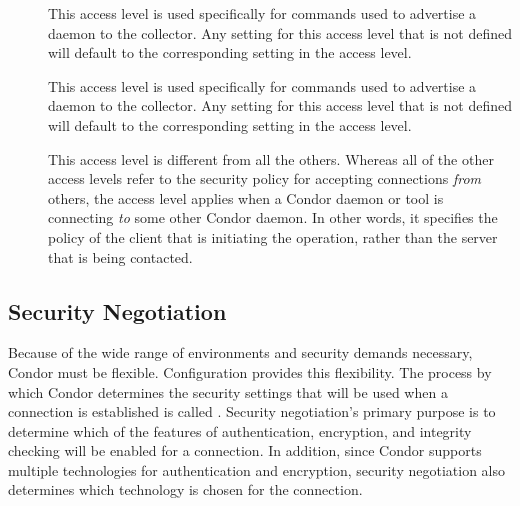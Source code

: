 \begin{description}
\item[] \label{sec-level-advertise-master} This
   access level is used specifically for commands used to advertise a
    daemon to the collector.  Any setting for this access
   level that is not defined will default to the corresponding setting
   in the  access level.

\item[] \label{sec-level-advertise-master} This
   access level is used specifically for commands used to advertise a
    daemon to the collector.  Any setting for this access
   level that is not defined will default to the corresponding setting
   in the  access level.

\item[] \label{sec-level-client} This access level is
   different from all the others.  Whereas all of the other access levels
   refer to the security policy for accepting connections \emph{from} others,
   the  access level applies when a Condor daemon or tool is
   connecting \emph{to} some other Condor daemon.  In other words, it specifies
   the policy of the client that is initiating the operation, rather than
   the server that is being contacted.

\end{description}

\subsection{\label{sec:Security-Negotiation}Security Negotiation}

Because of the wide range of environments and security demands necessary,
Condor must be flexible.
Configuration provides this flexibility.
The process by which Condor determines the security settings that will
be used when a connection is established is called
.
Security negotiation's primary purpose is to determine which
of the features of authentication, encryption, and integrity checking
will be enabled for a connection.
In addition, since Condor supports multiple
technologies for authentication and encryption,
security negotiation also
determines which technology is chosen for the connection.

